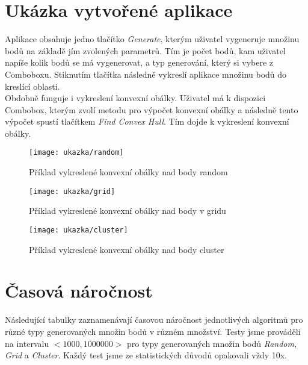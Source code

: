 \documentclass{article}
\begin{document}
\section{Ukázka vytvořené aplikace}
Aplikace obsahuje jedno tlačítko \emph{Generate}, kterým uživatel vygeneruje množinu bodů na základě jím zvolených parametrů. Tím je počet bodů, kam uživatel napíše kolik bodů se má vygenerovat, a typ generování, který si vybere z Comboboxu. Stiknutím tlačítka následně vykreslí aplikace množinu bodů do kreslící oblasti.\\

Obdobně funguje i vykreslení konvexní obálky. Uživatel má k dispozici Combobox, kterým zvolí metodu pro výpočet konvexní obálky a následně tento výpočet spustí tlačítkem \emph{Find Convex Hull}. Tím dojde k vykreslení konvexní obálky.
\begin{figure}[htbp]
\begin{center}
\texttt{[image: ukazka/random]} %
 \caption{Příklad vykreslené konvexní obálky nad body random}
\end{center}
\end{figure}

\begin{figure}[htbp]
\begin{center}
\texttt{[image: ukazka/grid]} %
 \caption{Příklad vykreslené konvexní obálky nad body v gridu}
\end{center}
\end{figure}

\begin{figure}[htbp]
\begin{center}
\texttt{[image: ukazka/cluster]} %
 \caption{Příklad vykreslené konvexní obálky nad body cluster}
\end{center}
\end{figure}
\section{Časová náročnost}
Následující tabulky zaznamenávají časovou náročnost jednotlivých algoritmů pro různé typy generovaných množin bodů v různém množství. Testy jsme prováděli na intervalu  $ <1000,1000000>$ pro typy generovaných množin bodů \emph{Random, Grid} a \emph{Cluster}. Každý test jsme ze statistických důvodů opakovali vždy 10x.\\
\end{document}
